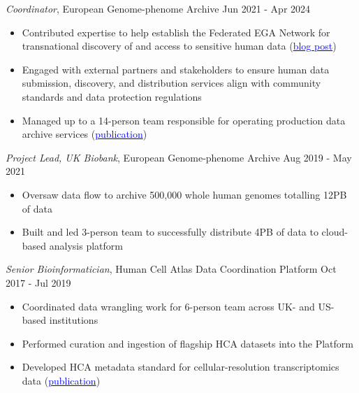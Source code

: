 \documentclass[margin,line]{res}
\begin{document}
\begin{resume}
{\em Coordinator}, European Genome-phenome Archive \hfill {Jun 2021 - Apr 2024}
\begin{itemize}
\itemsep0em 
	\item Contributed expertise to help establish the Federated EGA Network for transnational discovery of and access to sensitive human data (\href{https://ega-archive.org/blog/safe-access-to-sensitive-human-data-across-borders-federated-ega/}{\textcolor{blue}{blog post}})
	\item Engaged with external partners and stakeholders to ensure human data submission, discovery, and distribution services align with community standards and data protection regulations
	\item Managed up to a 14-person team responsible for operating production data archive services (\href{https://doi.org/10.1093/nar/gkab1059}{\textcolor{blue}{publication}})
\end{itemize}

{\em Project Lead, UK Biobank}, European Genome-phenome Archive \hfill {Aug 2019 - May 2021}
\begin{itemize}
\itemsep0em 
	\item Oversaw data flow to archive 500,000 whole human genomes totalling 12PB of data
	\item Built and led 3-person team to successfully distribute 4PB of data to cloud-based analysis platform
\end{itemize}

{\em Senior Bioinformatician}, Human Cell Atlas Data Coordination Platform \hfill {Oct 2017 - Jul 2019}
\begin{itemize}
\itemsep0em 
	\item Coordinated data wrangling work for 6-person team across UK- and US-based institutions
	\item Performed curation and ingestion of flagship HCA datasets into the Platform
	\item Developed HCA metadata standard for cellular-resolution transcriptomics data (\href{https://doi.org/10.1038/s41587-020-00744-z}{\textcolor{blue}{publication}})
\end{itemize}



\end{resume}
\end{document}
